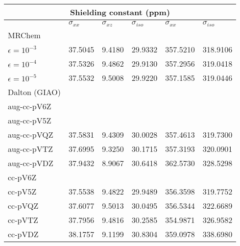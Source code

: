 \begin{frame}
\begin{table}
\tiny
\centering
\begin{tabular}{l|lll|ll}
\multicolumn{6}{c}{\textbf{Shielding constant (ppm)}}\\
\hline
\hline
                    &$\sigma_{xx}$ &$\sigma_{xz}$&$\sigma_{iso}$ 
                    &$\sigma_{xx}$ &$\sigma_{iso}$\\
\hline
MRChem              &         &         &         &         &         \\
$\epsilon=10^{-3}$  & 37.5045 & 9.4180  & 29.9332 & 357.5210& 318.9106\\
$\epsilon=10^{-4}$  & 37.5326 & 9.4862  & 29.9130 & 357.2956& 319.0418\\
$\epsilon=10^{-5}$  & 37.5532 & 9.5008  & 29.9220 & 357.1585& 319.0446\\
\hline                                                                
Dalton (GIAO)       &         &         &         &         &         \\
aug-cc-pV6Z         &         &         &         &         &         \\
aug-cc-pV5Z         &         &         &         &         &         \\
aug-cc-pVQZ         & 37.5831 & 9.4309  & 30.0028 & 357.4613& 319.7300\\
aug-cc-pVTZ         & 37.6995 & 9.3250  & 30.1715 & 357.3193& 320.0901\\
aug-cc-pVDZ         & 37.9432 & 8.9067  & 30.6418 & 362.5730& 328.5298\\
cc-pV6Z	            &         &         &         &         &         \\
cc-pV5Z	            & 37.5538 & 9.4822  & 29.9489 & 356.3598& 319.7752\\
cc-pVQZ	            & 37.6077 & 9.5013  & 30.0495 & 356.5344& 322.6689\\
cc-pVTZ	            & 37.7956 & 9.4816  & 30.2585 & 354.9871& 326.9582\\
cc-pVDZ	            & 38.1757 & 9.1199  & 30.8304 & 359.0978& 338.6980\\
\hline
\hline
\end{tabular}
\end{table}

\end{frame}


